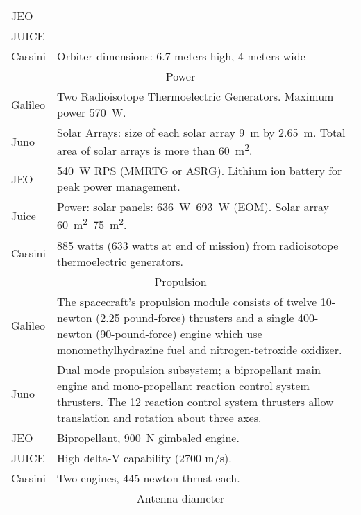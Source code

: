 \begin{longtable}{lp{}}
  JEO & \\

  JUICE & \\

  Cassini & Orbiter dimensions: 6.7 meters high, 4 meters wide \\

  \multicolumn{2}{c}{Power} \\ \midrule

  Galileo & Two Radio\-isotope Thermoelectric Generators. Maximum power
  \SI{570}{W}. \\

  Juno & Solar Arrays: size of each solar array \SI{9}{m} by
  \SI{2.65}{m}. Total area of solar arrays is more than
  \SI{60}{m^2}. \\

  JEO & \SI{540}{W} RPS (MMRTG or ASRG). Lithium ion battery for peak
  power management. \\

  Juice & Power: solar panels: \SI{636}{W}--\SI{693}{W} (EOM). Solar array
  \SI{60}{m^2}--\SI{75}{m^2}. \\

  Cassini & 885 watts (633 watts at end of mission) from radioisotope
  thermoelectric generators. \\

  \multicolumn{2}{c}{Propulsion} \\ \midrule

  Galileo & The spacecraft's propulsion module consists of twelve
  10-newton (2.25 pound\--force) thrusters and a single 400-newton
  (90-pound-force) engine which use monomethylhydrazine fuel and
  nitrogen-tetroxide oxidizer. \\

  Juno & Dual mode propulsion subsystem; a bipropellant main engine and
  mono-propellant reaction control system thrusters. The 12 reaction
  control system thrusters allow translation and rotation about three
  axes. \\

  JEO & Bipropellant, \SI{900}{N} gimbaled engine. \\

  JUICE & High delta-V capability (2700 m/s). \\

  Cassini & Two engines, 445 newton thrust each. \\

  \multicolumn{2}{c}{Antenna diameter} \\ \midrule


\end{longtable}
